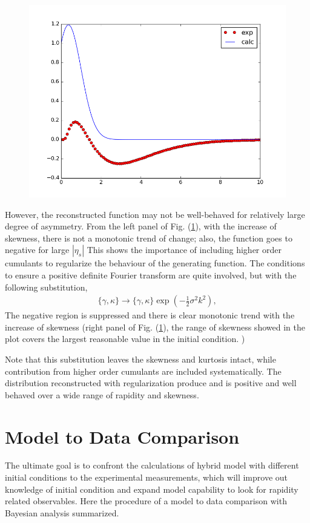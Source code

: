 \documentclass[aps,prl,twocolumn,groupedaddress]{revtex4-1}
\begin{document}
	\begin{figure}\label{regulation}
	\includegraphics[width=\columnwidth]{pics/place_holder.png}
	\end{figure}
 
	However, the reconstructed function may not be well-behaved for relatively large degree of asymmetry. 
	From the left panel of Fig. (\ref{regulation}), with the increase of skewness, there is not a monotonic trend of change; also, the function goes to negative for large $|\eta_s|$
	This shows the importance of including higher order cumulants to regularize the behaviour of the generating function. 
	The conditions to ensure a positive definite Fourier transform are quite involved, but with the following substitution,
	\begin{eqnarray}
		\{\gamma, \kappa\} \rightarrow \{\gamma, \kappa\} \exp\left(-\frac{1}{2}\sigma^2k^2\right),
	\end{eqnarray}
	The negative region is suppressed and there is clear monotonic trend with the increase of skewness (right panel of Fig. (\ref{regulation}), the range of skewness showed in the plot covers the largest reasonable value in the initial condition. )
		
	Note that this substitution leaves the skewness and kurtosis intact, while contribution from higher order cumulants are included systematically.
	The distribution reconstructed with regularization produce and is positive and well behaved over a wide range of rapidity and skewness.

\section{Model to Data Comparison}
	The ultimate goal is to confront the calculations of hybrid model with different initial conditions to the experimental measurements, which will improve out knowledge of initial condition and expand model capability to look for rapidity related observables.
	Here the procedure of a model to data comparison with Bayesian analysis summarized.
	
\end{document}
